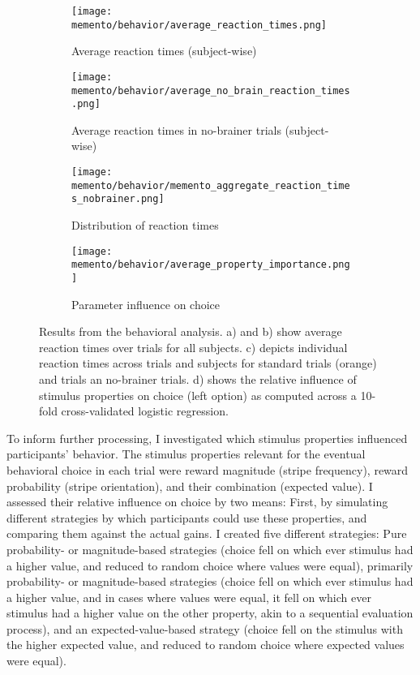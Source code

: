 \begin{figure}[H]
	\centering
	\begin{subfigure}[t]{0.4\textwidth}
		\texttt{[image: memento/behavior/average\_reaction\_times.png]}
		\caption{Average reaction times (subject-wise)}
		\label{fig:avgreactions}
	\end{subfigure}
	\begin{subfigure}[t]{0.4\textwidth}
		\texttt{[image: memento/behavior/average\_no\_brain\_reaction\_times.png]}
		\caption{Average reaction times in no-brainer trials (subject-wise)}
		\label{fig:avgreactionsnobrain}
	\end{subfigure}
	\begin{subfigure}[t]{0.45\textwidth}
		\texttt{[image: memento/behavior/memento\_aggregate\_reaction\_times\_nobrainer.png]}
		\caption{Distribution of reaction times}
		\label{fig:reactiontimes}
	\end{subfigure}
	\begin{subfigure}[t]{0.45\textwidth}
		\texttt{[image: memento/behavior/average\_property\_importance.png]}
		\caption{Parameter influence on choice}
		\label{fig:logregbehavior}
	\end{subfigure}

	\caption[Behavioral results]{Results from the behavioral analysis. a) and b) show average reaction times over trials for all subjects. c) depicts individual reaction times across trials and subjects for standard trials (orange) and trials an no-brainer trials. d) shows the relative influence of stimulus properties on choice (left option) as computed across a 10-fold cross-validated logistic regression.}
	\label{fig:behav}
\end{figure}
To inform further processing, I investigated which stimulus properties influenced participants' behavior.
The stimulus properties relevant for the eventual behavioral choice in each trial were reward magnitude (stripe frequency), reward probability (stripe orientation), and their combination (expected value).
I assessed their relative influence on choice by two means: First, by simulating different strategies by which participants could use these properties, and comparing them against the actual gains.
I created five different strategies: Pure probability- or magnitude-based strategies (choice fell on which ever stimulus had a higher value, and reduced to random choice where values were equal), primarily probability- or magnitude-based strategies (choice fell on which ever stimulus had a higher value, and in cases where values were equal, it fell on which ever stimulus had a higher value on the other property, akin to a sequential evaluation process), and an expected-value-based strategy (choice fell on the stimulus with the higher expected value, and reduced to random choice where expected values were equal).
